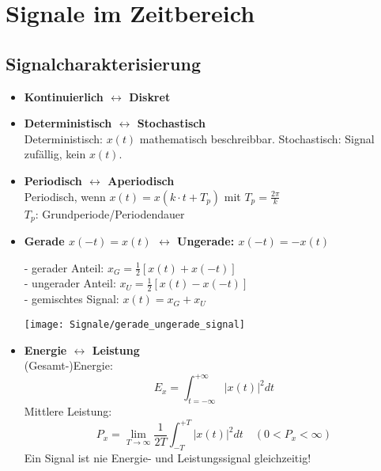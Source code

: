 \section{Signale im Zeitbereich}
  \subsection{Signalcharakterisierung}
  \begin{itemize}
      \item{\textbf{Kontinuierlich \hfill $\longleftrightarrow$ \hfill Diskret}}
      \item{\textbf{Deterministisch \hfill $\longleftrightarrow$ \hfill Stochastisch}}\\
          Deterministisch: $x(t)$ mathematisch beschreibbar.
          Stochastisch: Signal zufällig, kein $x(t)$.
      \item{\textbf{Periodisch \hfill $\longleftrightarrow$ \hfill Aperiodisch}}\\
              Periodisch, wenn $x(t)=x(k \cdot t+T_p)$ mit
			  $T_p = \frac{2\pi}{k}$ \\
              $T_p$: Grundperiode/Periodendauer
      \item{\textbf{Gerade $x(-t)=x(t)$ $\leftrightarrow$ Ungerade: $x(-t)=-x(t)$}}\\
          \begin{mdframed}[style=exercise,frametitle=Zerlegung des Signals:]
              - gerader Anteil: \quad $x_G=\frac{1}{2}\left[x(t)+x(-t)\right]$\\
              - ungerader Anteil: \quad $x_U=\frac{1}{2}\left[ x(t)-x(-t) \right]$\\
              - gemischtes Signal: $x(t)=x_G + x_U$
          \end{mdframed}
          \begin{center}
              \texttt{[image: Signale/gerade\_ungerade\_signal]}
          \end{center}
      \item{\textbf{Energie \hfill $\longleftrightarrow$ \hfill Leistung}}\\
              (Gesamt-)Energie: \[E_x=\int_{t=-\infty}^{+\infty}\lvert x(t)\rvert^2 dt\]
              Mittlere Leistung: \[P_x=\lim_{T\to\infty}\frac{1}{2T}\int_{-T}^{+T}\lvert x(t)\rvert^2 dt \quad (0<P_x<\infty)\]
                {\small Ein Signal ist nie Energie- und Leistungssignal gleichzeitig!}
          

\end{itemize}
